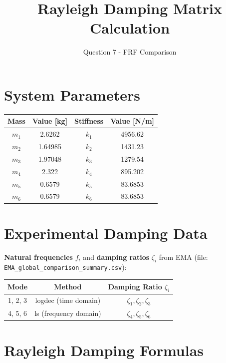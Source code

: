 \documentclass[11pt,a4paper]{article}
\title{\textbf{Rayleigh Damping Matrix Calculation}}
\author{Question 7 - FRF Comparison}
\date{}
\begin{document}
\maketitle

\section{System Parameters}

\begin{table}[h]
\centering
\begin{tabular}{cccc}
\toprule
\textbf{Mass} & \textbf{Value [kg]} & \textbf{Stiffness} & \textbf{Value [N/m]} \\
\midrule
$m_1$ & 2.6262 & $k_1$ & 4956.62 \\
$m_2$ & 1.64985 & $k_2$ & 1431.23 \\
$m_3$ & 1.97048 & $k_3$ & 1279.54 \\
$m_4$ & 2.322 & $k_4$ & 895.202 \\
$m_5$ & 0.6579 & $k_5$ & 83.6853 \\
$m_6$ & 0.6579 & $k_6$ & 83.6853 \\
\bottomrule
\end{tabular}
\end{table}

\section{Experimental Damping Data}

\textbf{Natural frequencies} $f_i$ and \textbf{damping ratios} $\zeta_i$ from EMA (file: \texttt{EMA\_global\_comparison\_summary.csv}):

\begin{table}[h]
\centering
\begin{tabular}{ccc}
\toprule
\textbf{Mode} & \textbf{Method} & \textbf{Damping Ratio} $\zeta_i$ \\
\midrule
1, 2, 3 & logdec (time domain) & $\zeta_1, \zeta_2, \zeta_3$ \\
4, 5, 6 & ls (frequency domain) & $\zeta_4, \zeta_5, \zeta_6$ \\
\bottomrule
\end{tabular}
\end{table}

\section{Rayleigh Damping Formulas}
\end{document}
